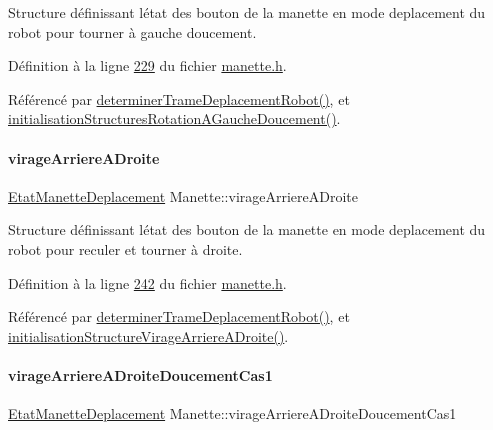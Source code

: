 Structure définissant l\textquotesingle{}état des bouton de la manette en mode deplacement du robot pour tourner à gauche doucement. 



Définition à la ligne \hyperlink{manette_8h_source_l00229}{229} du fichier \hyperlink{manette_8h_source}{manette.\+h}.



Référencé par \hyperlink{manette_8cpp_source_l00341}{determiner\+Trame\+Deplacement\+Robot()}, et \hyperlink{manette_8cpp_source_l00161}{initialisation\+Structures\+Rotation\+A\+Gauche\+Doucement()}.

\mbox{\label{class_manette_a6df334aec9f621e7394e9f398221fe9e}} 
\paragraph{\texorpdfstring{virage\+Arriere\+A\+Droite}{virageArriereADroite}}
{\footnotesize\ttfamily \hyperlink{struct_etat_manette_deplacement}{Etat\+Manette\+Deplacement} Manette\+::virage\+Arriere\+A\+Droite\hspace{0.3cm}{\ttfamily [private]}}



Structure définissant l\textquotesingle{}état des bouton de la manette en mode deplacement du robot pour reculer et tourner à droite. 



Définition à la ligne \hyperlink{manette_8h_source_l00242}{242} du fichier \hyperlink{manette_8h_source}{manette.\+h}.



Référencé par \hyperlink{manette_8cpp_source_l00341}{determiner\+Trame\+Deplacement\+Robot()}, et \hyperlink{manette_8cpp_source_l00286}{initialisation\+Structure\+Virage\+Arriere\+A\+Droite()}.

\mbox{\label{class_manette_a2dddb8a8a6f75abc15ddf58025b98ecc}} 
\paragraph{\texorpdfstring{virage\+Arriere\+A\+Droite\+Doucement\+Cas1}{virageArriereADroiteDoucementCas1}}
{\footnotesize\ttfamily \hyperlink{struct_etat_manette_deplacement}{Etat\+Manette\+Deplacement} Manette\+::virage\+Arriere\+A\+Droite\+Doucement\+Cas1\hspace{0.3cm}{\ttfamily [private]}}



